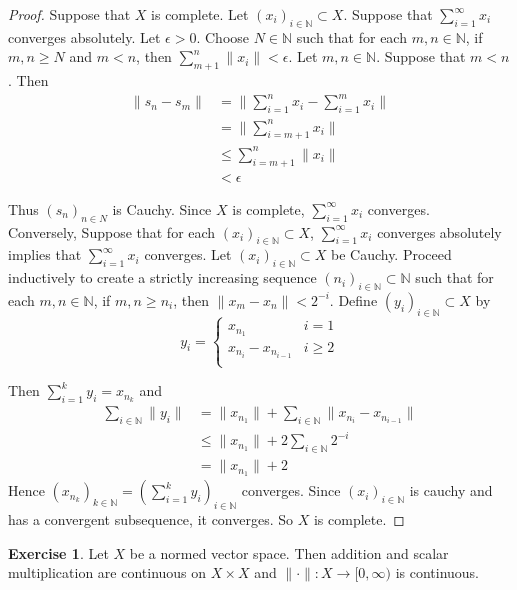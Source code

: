 \documentclass[12pt]{amsart}
\theoremstyle{definition}
\newtheorem{ex}[definition]{Exercise}
\newcommand{\ep}{\epsilon}
\newcommand{\N}{\mathbb{N}}
\newcommand{\Rg}{[0,\infty)}
\newcommand{\seq}[2]{(#1_{#2})_{#2 \in \N}}
\newcommand{\lex}[1]{\label{ex:#1}}
\begin{document}
	\begin{proof}
		Suppose that $X$ is complete. Let $\seq{x}{i} \subset X$. Suppose that $\sum_{i=1}^{\infty}x_i$ converges absolutely. Let $\ep >0$. Choose $N \in \N$ such that for each $m,n \in \N$, if $m, n \geq N$ and $m< n$, then $\sum_{m+1}^n \|x_i \|< \ep$. Let $m, n \in \N$. Suppose that $m<n$. Then 
		\begin{align*}
			\|s_n-s_m \|
			&= \bigg \|\sum_{i=1}^n x_i -\sum_{i=1}^m x_i\bigg \|\\
			&= \bigg\|\sum_{i=m+1}^{n} x_i \bigg \| \\
			& \leq \sum_{i=m+1}^n \|x_i \|\\
			& < \ep
		\end{align*}
		
		Thus $(s_n)_{n \in N}$ is Cauchy. Since $X$ is complete, $\sum_{i=1}^{\infty}x_i$ converges. \\
		Conversely, Suppose that for each $\seq{x}{i} \subset X$, $\sum_{i =1}^{\infty}x_i$ converges absolutely implies that $\sum_{i=1}^{\infty}x_i$ converges. Let $\seq{x}{i} \subset X$ be Cauchy. Proceed inductively to create a strictly increasing sequence $(n_i)_{i \in \N} \subset \N$ such that for each $m, n \in \N$, if $m,n \geq n_i$, then $ \|x_m-x_n \|< 2^{-i}$. Define $(y_i)_{i \in \N} \subset X$ by 
		\[ y_i = \begin{cases}
			x_{n_1} & i=1 \\
			x_{n_i} - x_{n_{i-1}} & i \geq 2\\
		\end{cases}\]
		
		Then $\sum_{i=1}^k y_i = x_{n_k}$ and 
		\begin{align*}
			\sum_{i \in \N} \|y_i \|
			&= \|x_{n_1} \|+ \sum_{i \in \N} \|x_{n_i}-x_{n_{i-1}} \|\\
			& \leq \|x_{n_1} \|+ 2\sum_{i \in \N}2^{-i}\\
			& = \|x_{n_1} \|+2
		\end{align*}
		Hence $(x_{n_k})_{k \in \N} = (\sum_{i=1}^k y_i)_{i\in \N}$ converges. Since $(x_i)_{i \in \N}$ is cauchy and has a convergent subsequence, it converges. So $X$ is complete.
	\end{proof}
	
	\begin{ex} \lex{}
		Let $X$ be a normed vector space. Then addition and scalar multiplication are continuous on $X \times X$ and $\|\cdot \|:X \rightarrow \Rg$ is continuous.
	\end{ex}
	
\end{document}
